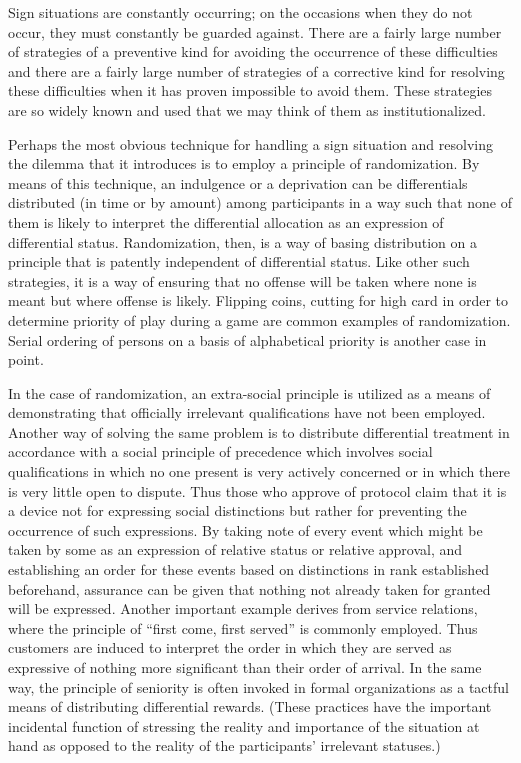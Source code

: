 \documentclass[openany,nobib]{tufte-book}
\begin{document}
Sign situations are constantly occurring; on the occasions when they do
not occur, they must constantly be guarded against. There are a fairly
large number of strategies of a preventive kind for avoiding the
occurrence of these difficulties and there are a fairly large number of
strategies of a corrective kind for resolving these difficulties when it
has proven impossible to avoid them. These strategies are so widely
known and used that we may think of them as institutionalized.

Perhaps the most obvious technique for handling a sign situation and
resolving the dilemma that it introduces is to employ a principle of
randomization. By means of this technique, an indulgence or a
deprivation can be differentials distributed (in time or by amount)
among participants in a way such that none of them is likely to
interpret the differential allocation as an expression of differential
status. Randomization, then, is a way of basing distribution on a
principle that is patently independent of differential status. Like
other such strategies, it is a way of ensuring that no offense will be
taken where none is meant but where offense is likely. Flipping coins,
cutting for high card in order to determine priority of play during a
game are common examples of randomization. Serial ordering of persons on
a basis of alphabetical priority is another case in point.

In the case of randomization, an extra-social principle is utilized as a
means of demonstrating that officially irrelevant qualifications have
not been employed. Another way of solving the same problem is to
distribute differential treatment in accordance with a social principle
of precedence which involves social qualifications in which no one
present is very actively concerned or in which there is very little open
to dispute. Thus those who approve of protocol claim that it is a device
not for expressing social distinctions but rather for preventing the
occurrence of such expressions. By taking note of every event which
might be taken by some as an expression of relative status or relative
approval, and establishing an order for these events based on
distinctions in rank established beforehand, assurance can be given that
nothing not already taken for granted will be expressed. Another
important example derives from service relations, where the principle of
``first come, first served'' is commonly employed. Thus customers are
induced to interpret the order in which they are served as expressive of
nothing more significant than their order of arrival. In the same way,
the principle of seniority is often invoked in formal organizations as a
tactful means of distributing differential rewards. (These practices
have the important incidental function of stressing the reality and
importance of the situation at hand as opposed to the reality of the
participants' irrelevant statuses.)
\end{document}
